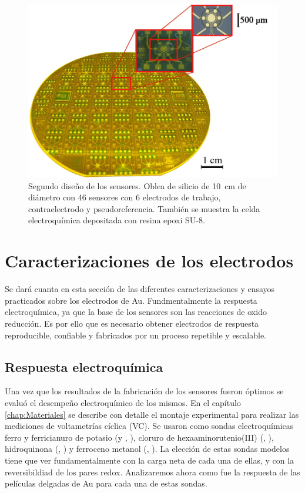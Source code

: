 					  \begin{figure}[ht!]
					  \begin{center}
					  \includegraphics[width=\textwidth]{Imagenes/ObleaV2.jpg}
					  \caption[Electrodos, segunda versión]{Segundo diseño de los sensores. Oblea de silicio de \SI{10}{cm} de diámetro con 46 sensores con 6 electrodos de trabajo, contraelectrodo y pseudoreferencia. También se muestra la celda electroquímica depositada con resina epoxi SU-8.}
					  \label{fig:ObleaV2}
					  \end{center}
					  \end{figure} 	
		
\section{Caracterizaciones de los electrodos}

		Se dará cuanta en esta sección de las diferentes caracterizaciones y ensayos practicados sobre los electrodos de Au. Fundmentalmente la respuesta electroquímica, ya que la base de los sensores son las reacciones de oxido reducción. Es por ello que es necesario obtener electrodos de respuesta reproducible, confiable y fabricados por un proceso repetible y escalable. 

	\subsection{Respuesta electroquímica}\label{sec:respuesta_sondas_au}
			 		
			Una vez que los resultados de la fabricación de los sensores fueron óptimos se evaluó el desempeño electroquímico de los mismos. En el capítulo \ref{chap:Materiales} se describe con detalle el montaje experimental para realizar las mediciones de voltametrías cíclica (VC). Se usaron como sondas electroquímicas ferro y ferricianuro de potasio (\Ferro\space y \Ferri, \fe), cloruro de hexaaminorutenio(III) (\aminorutenioCompleto, \ru), hidroquinona (\hidroquinona, \hq) y ferroceno metanol \linebreak (\ferroceno, \fc). La elección de estas sondas modelos tiene que ver fundamentalmente con la carga neta de cada una de ellas, y con la reversibildiad de los pares redox. Analizaremos ahora como fue la respuesta de las películas delgadas de Au para cada una de estas sondas.
				

